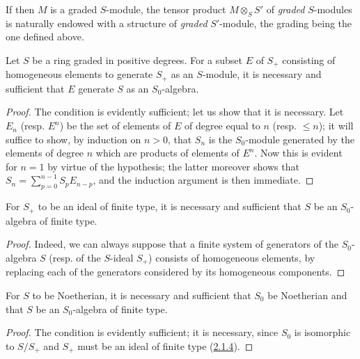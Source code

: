 \begin{env}[2.1.2]
If then $M$ is a graded $S$-module, the tensor product $M\otimes_S S'$
of \emph{graded} $S$-modules is naturally endowed with a structure of
\emph{graded} $S'$-module, the grading being the one defined above.
\end{env}

\begin{lemma}[2.1.3]
\label{II.2.1.3}
Let $S$ be a ring graded in positive degrees. For a subset $E$ of $S_+$
consisting of homogeneous elements to generate $S_+$ as an $S$-module, it is
necessary and sufficient that $E$ generate $S$ as an $S_0$-algebra.
\end{lemma}

\begin{proof}
The condition is evidently sufficient; let us show that it is necessary.
Let $E_n$ (resp. $E^n$) be the set of elements of $E$ of degree equal to $n$
(resp. $\leq n$); it will suffice to show, by induction on $n>0$, that $S_n$
is the $S_0$-module generated by the elements of degree $n$ which are
products of elements of $E^n$. Now this is evident for $n=1$ by virtue of
the hypothesis; the latter moreover shows that
$S_n=\sum_{p=0}^{n-1}S_pE_{n-p}$, and the induction argument is then
immediate.
\end{proof}

\begin{corollary}[2.1.4]
\label{II.2.1.4}
For $S_+$ to be an ideal of finite type, it is necessary and sufficient that
$S$ be an $S_0$-algebra of finite type.
\end{corollary}

\begin{proof}
Indeed, we can always suppose that a finite system of generators of the
$S_0$-algebra $S$ (resp. of the $S$-ideal $S_+$) consists of homogeneous
elements, by replacing each of the generators considered by its homogeneous
components.
\end{proof}

\begin{corollary}[2.1.5]
\label{II.2.1.5}
For $S$ to be Noetherian, it is necessary and sufficient that $S_0$ be
Noetherian and that $S$ be an $S_0$-algebra of finite type.
\end{corollary}

\begin{proof}
The condition is evidently sufficient; it is necessary, since $S_0$
is isomorphic to $S/S_+$ and $S_+$ must be an ideal of finite type
(\hyperref[II.2.1.4]{2.1.4}).
\end{proof}

